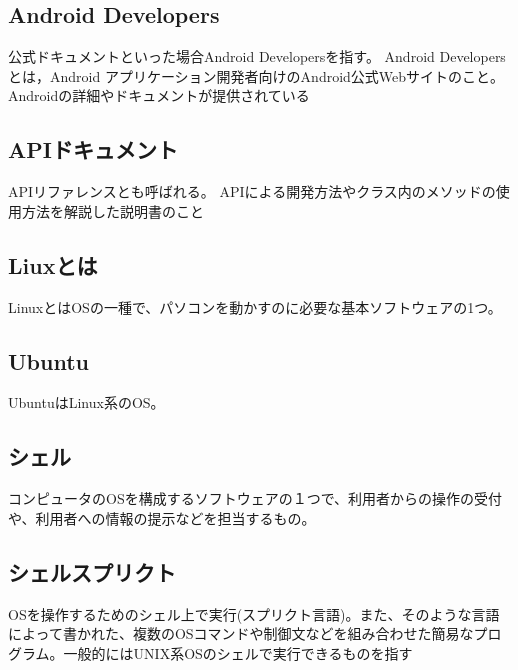 \subsection{Android Developers}
公式ドキュメントといった場合Android Developersを指す。
Android Developers とは，Android アプリケーション開発者向けのAndroid公式Webサイトのこと。Androidの詳細やドキュメントが提供されている

\subsection{APIドキュメント}
APIリファレンスとも呼ばれる。
APIによる開発方法やクラス内のメソッドの使用方法を解説した説明書のこと

\subsection{Liuxとは}
LinuxとはOSの一種で、パソコンを動かすのに必要な基本ソフトウェアの1つ。

\subsection{Ubuntu}
UbuntuはLinux系のOS。

\subsection{シェル}
コンピュータのOSを構成するソフトウェアの１つで、利用者からの操作の受付や、利用者への情報の提示などを担当するもの。

\subsection{シェルスプリクト}
OSを操作するためのシェル上で実行(スプリクト言語)。また、そのような言語によって書かれた、複数のOSコマンドや制御文などを組み合わせた簡易なプログラム。一般的にはUNIX系OSのシェルで実行できるものを指す

